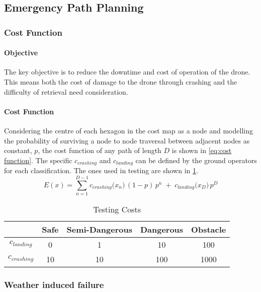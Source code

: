 \subsection{Emergency Path Planning}

\subsubsection{Cost Function}
\paragraph{Objective}
The key objective is to reduce the downtime and cost of operation of the drone. This means both the cost of damage to the drone through crashing and the difficulty of retrieval need consideration.
\paragraph{Cost Function}
Considering the centre of each hexagon in the cost map as a node and modelling the probability of surviving a node to node traversal between adjacent nodes as constant, $p$, the cost function of any path of length $D$ is shown in \ref{eq:cost function}. The specific $c_{crashing}$ and $c_{landing}$ can be defined by the ground operators for each classification. The ones used in testing are shown in \ref{tab:cost_values}.
\begin{equation}\label{eq:cost function}
    E(x) 
    = \sum_{n=1}^{D-1} c_{crashing}\bigl(x_n\bigr)\, (1-p) \,p^n 
    \;+\; c_{landing}\bigl(x_D\bigr)\, p^D
\end{equation}
\begin{table}[h]
    \centering
    \begin{tabular}{|c|c|c|c|c|}
    \hline
         \textbf{} & \textbf{Safe} & \textbf{Semi-Dangerous} & \textbf{Dangerous} & \textbf{Obstacle} \\
         \hline
         \textbf{$c_{landing}$} & 0 & 1 & 10 & 100 \\
         \textbf{$c_{crashing}$} & 10 & 10 & 100 & 1000\\
         \hline
    \end{tabular}
    \caption{Testing Costs}
    \label{tab:cost_values}
\end{table}

\subsubsection{Weather induced failure}
